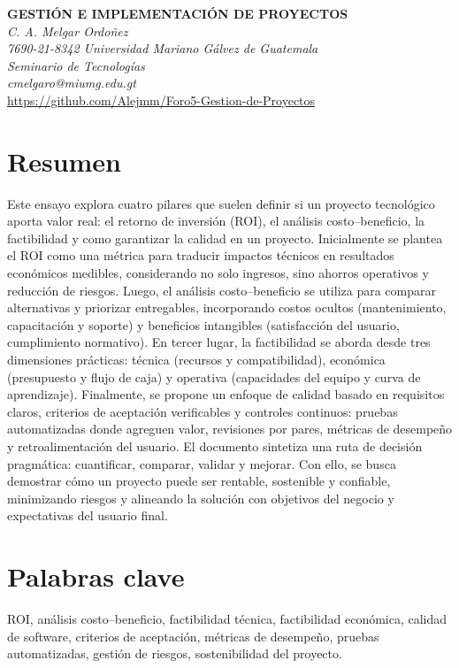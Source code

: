 \documentclass[12pt]{article}
\begin{document}
\begin{center}
\textbf{\MakeUppercase{GESTIÓN E IMPLEMENTACIÓN DE PROYECTOS}}\\[1ex]
\textit{C. A. Melgar Ordoñez}\\
\textit{7690-21-8342 Universidad Mariano Gálvez de Guatemala}\\
\textit{Seminario de Tecnologías}\\
\textit{cmelgaro@miumg.edu.gt}\\
\url{https://github.com/Alejmm/Foro5-Gestion-de-Proyectos}\\
\end{center}

\vspace{1em}

\section*{Resumen}
Este ensayo explora cuatro pilares que suelen definir si un proyecto tecnológico aporta valor real: el retorno de inversión (ROI), el análisis costo–beneficio, la factibilidad y como garantizar la calidad en un proyecto. Inicialmente se plantea el ROI como una métrica para traducir impactos técnicos en resultados económicos medibles, considerando no solo ingresos, sino ahorros operativos y reducción de riesgos. Luego, el análisis costo–beneficio se utiliza para comparar alternativas y priorizar entregables, incorporando costos ocultos (mantenimiento, capacitación y soporte) y beneficios intangibles (satisfacción del usuario, cumplimiento normativo). En tercer lugar, la factibilidad se aborda desde tres dimensiones prácticas: técnica (recursos y compatibilidad), económica (presupuesto y flujo de caja) y operativa (capacidades del equipo y curva de aprendizaje). Finalmente, se propone un enfoque de calidad basado en requisitos claros, criterios de aceptación verificables y controles continuos: pruebas automatizadas donde agreguen valor, revisiones por pares, métricas de desempeño y retroalimentación del usuario. El documento sintetiza una ruta de decisión pragmática: cuantificar, comparar, validar y mejorar. Con ello, se busca demostrar cómo un proyecto puede ser rentable, sostenible y confiable, minimizando riesgos y alineando la solución con objetivos del negocio y expectativas del usuario final.

\section*{Palabras clave}
ROI, análisis costo–beneficio, factibilidad técnica, factibilidad económica, calidad de software, criterios de aceptación, métricas de desempeño, pruebas automatizadas, gestión de riesgos, sostenibilidad del proyecto.
\end{document}

